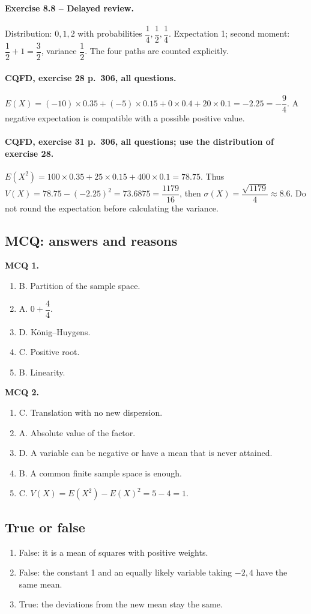 \paragraph{Exercise 8.8 -- Delayed review.} Distribution: $0,1,2$ with probabilities $\dfrac{1}{4},\dfrac{1}{2},\dfrac{1}{4}$. Expectation 1; second moment: $\dfrac{1}{2}+1=\dfrac{3}{2}$, variance $\dfrac{1}{2}$. The four paths are counted explicitly.
\paragraph{CQFD, exercise 28 p.~306, all questions.} $E(X)=(-10)\times\num{0,35}+(-5)\times\num{0,15}+0\times\num{0,4}+20\times\num{0,1}=-\num{2,25}=-\dfrac94$. A negative expectation is compatible with a possible positive value.
\paragraph{CQFD, exercise 31 p.~306, all questions; use the distribution of exercise 28.} $E(X^2)=100\times\num{0,35}+25\times\num{0,15}+400\times\num{0,1}=\num{78,75}$. Thus $V(X)=\num{78,75}-(-\num{2,25})^2=\num{73,6875}=\dfrac{1179}{16}$, then $\sigma(X)=\dfrac{\sqrt{1179}}4\approx\num{8,6}$. Do not round the expectation before calculating the variance.
\subsection*{MCQ: answers and reasons}
\textbf{MCQ 1.}
\begin{enumerate}
\item B. Partition of the sample space.
\item A. $0+\dfrac{4}{4}$.
\item D. König--Huygens.
\item C. Positive root.
\item B. Linearity.
\end{enumerate}
\textbf{MCQ 2.}
\begin{enumerate}
\item C. Translation with no new dispersion.
\item A. Absolute value of the factor.
\item D. A variable can be negative or have a mean that is never attained.
\item B. A common finite sample space is enough.
\item C. $V(X)=E(X^2)-E(X)^2=5-4=1$.
\end{enumerate}
\subsection*{True or false}
\begin{enumerate}
\item False: it is a mean of squares with positive weights.
\item False: the constant 1 and an equally likely variable taking $-2,4$ have the same mean.
\item True: the deviations from the new mean stay the same.
\end{enumerate}
